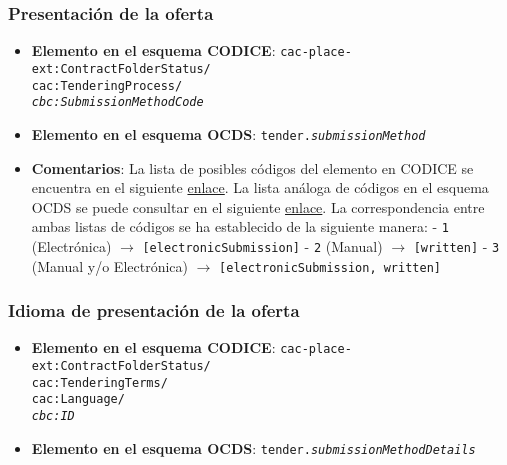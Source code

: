         \subsubsection{Presentación de la oferta} \label{subsec:PresentacionOferta}
            \begin{itemize}
                \item \textbf{Elemento en el esquema CODICE}:
                    \tabto{7.6cm} \texttt{cac-place-ext:ContractFolderStatus/} \\
                    \tabto{7.6cm} \texttt{cac:TenderingProcess/} \\
                    \tabto{7.6cm} \texttt{\textit{cbc:SubmissionMethodCode}}
                \item \textbf{Elemento en el esquema OCDS}:
                    \tabto{7.6cm} \texttt{tender.\textit{submissionMethod}}
                \item \textbf{Comentarios}: La lista de posibles códigos del elemento en CODICE se encuentra en el siguiente 
                    \href{https://contrataciondelestado.es/codice/cl/1.04/TenderDeliveryCode-1.04.gc}{enlace}.
                    La lista análoga de códigos en el esquema OCDS se puede consultar en el siguiente
                    \href{https://standard.open-contracting.org/latest/es/schema/codelists/#submission-method}{enlace}.
                    La correspondencia entre ambas listas de códigos se ha establecido de la siguiente manera:
                        \subitem - \texttt{1} (Electrónica) $\rightarrow$ \texttt{[electronicSubmission]}
                        \subitem - \texttt{2} (Manual) $\rightarrow$ \texttt{[written]}
                        \subitem - \texttt{3} (Manual y/o Electrónica) $\rightarrow$ \texttt{[electronicSubmission, written]}
            \end{itemize}
        
        \subsubsection{Idioma de presentación de la oferta}
            \begin{itemize}
                \item \textbf{Elemento en el esquema CODICE}:
                    \tabto{7.6cm} \texttt{cac-place-ext:ContractFolderStatus/} \\
                    \tabto{7.6cm} \texttt{cac:TenderingTerms/} \\
                    \tabto{7.6cm} \texttt{cac:Language/} \\
                    \tabto{7.6cm} \texttt{\textit{cbc:ID}}
                \item \textbf{Elemento en el esquema OCDS}:
                    \tabto{7.6cm} \texttt{tender.\textit{submissionMethodDetails}}
            \end{itemize}
        
